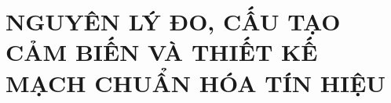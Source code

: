 \chapter{NGUYÊN LÝ ĐO, CẤU TẠO CẢM BIẾN VÀ THIẾT KẾ MẠCH CHUẨN HÓA TÍN HIỆU}
\label{chap:nguyenly}





